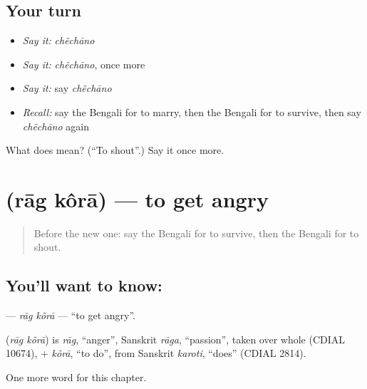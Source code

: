 \subsection*{Your turn}
\begin{itemize}
\raggedright
  \item \emph{Say it:} \emph{chẽchāno}
  \item \emph{Say it:} \emph{chẽchāno}, once more
  \item \emph{Say it:} say \emph{chẽchāno}
  \item \emph{Recall:} say the Bengali for to marry, then the Bengali for to survive, then say \emph{chẽchāno} again
\end{itemize}

\begin{tcolorbox}[breakable,colback=teal!4,colframe=teal!35!black,title={Before you move on}]
What does  mean? (\textquotedblleft{}To shout\textquotedblright{}.) Say it once more.
\end{tcolorbox}
\section[\texorpdfstring{\bn{রাগ} \bn{করা} (rāg kôrā)}{রাগ করা (rāg kôrā)}]{  (rāg kôrā) — to get angry}

\label{lesson:BN-C211-rag-kora}



\begin{quote}
Before the new one: say the Bengali for to survive, then the Bengali for to shout.
\end{quote}

\subsection*{You'll want to know:  }
\textbf{ } — \emph{rāg kôrā} — \textquotedblleft{}to get angry\textquotedblright{}.

\begin{cousinweb}
\textbf{ } (\emph{rāg kôrā}) is \emph{rāg}, \textquotedblleft{}anger\textquotedblright{}, Sanskrit \emph{rāga}, \textquotedblleft{}passion\textquotedblright{}, taken over whole (CDIAL 10674), + \emph{kôrā}, \textquotedblleft{}to do\textquotedblright{}, from Sanskrit \emph{karoti}, \textquotedblleft{}does\textquotedblright{} (CDIAL 2814).
\end{cousinweb}

\begin{grammarlens}[title={What you've built}]
One more word for this chapter.
\end{grammarlens}

